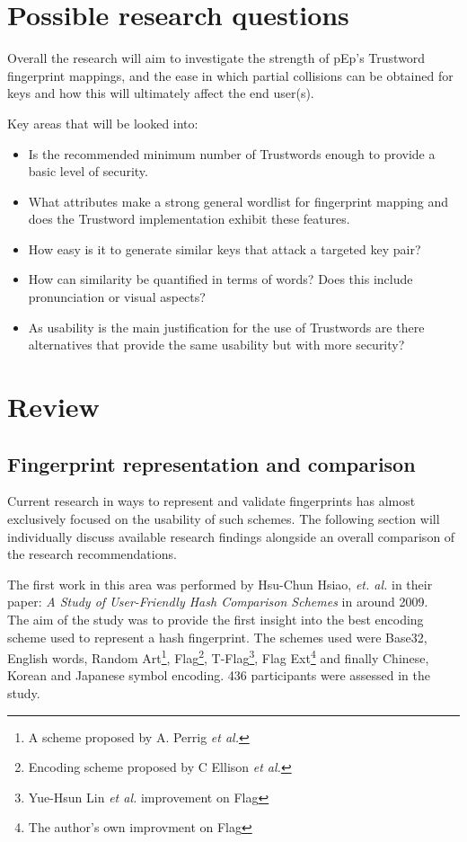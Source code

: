 \section{Possible research questions}

Overall the research will aim to investigate the strength of pEp's Trustword fingerprint mappings, and the ease in which partial collisions can be obtained for keys and how this will ultimately affect the end user(s).

Key areas that will be looked into:
\begin{itemize}
    \item Is the recommended minimum number of Trustwords enough to provide a basic level of security.
    \item What attributes make a strong general wordlist for fingerprint mapping and does the Trustword implementation exhibit these features.
    \item How easy is it to generate similar keys that attack a targeted key pair?
    \item How can similarity be quantified in terms of words? Does this include pronunciation or visual aspects?
    \item As usability is the main justification for the use of Trustwords are there alternatives that provide the same usability but with more security?
\end{itemize}

\section{Review}

\subsection{Fingerprint representation and comparison}

Current research in ways to represent and validate fingerprints has almost exclusively focused on the usability of such schemes. The following section will individually discuss available research findings alongside an overall comparison of the research recommendations.

The first work in this area was performed by Hsu-Chun Hsiao, \textit{et. al.} in their paper: \textit{A Study of User-Friendly Hash Comparison Schemes}\cite{hsiao2009study} in around 2009. \\
The aim of the study was to provide the first insight into the best encoding scheme used to represent a hash fingerprint. The schemes used were Base32, English words, Random Art\footnote{A scheme proposed by A. Perrig \textit{et al.}\cite{perrig1999hash}}, Flag\footnote{Encoding scheme proposed by C Ellison \textit{et al.}\cite{ellison2003public}}, T-Flag\footnote{Yue-Hsun Lin \textit{et al.}\cite{lin2010spate} improvement on Flag}, Flag Ext\footnote{The author's own improvment on Flag} and finally Chinese, Korean and Japanese symbol encoding. 436 participants were assessed in the study.


